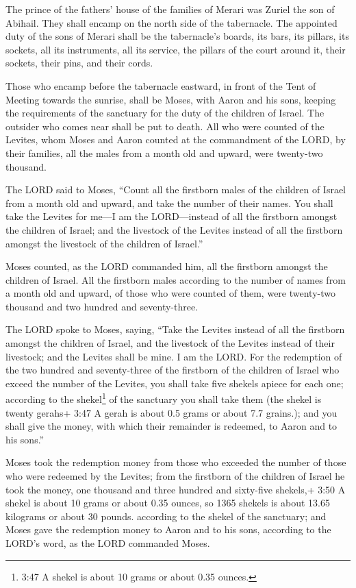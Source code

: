  The prince of the fathers' house of the families of Merari
was Zuriel the son of Abihail. They shall encamp on the north side of
the tabernacle.  The appointed duty of the sons of Merari
shall be the tabernacle's boards, its bars, its pillars, its sockets,
all its instruments, all its service,  the pillars of the
court around it, their sockets, their pins, and their cords.

 Those who encamp before the tabernacle eastward, in front
of the Tent of Meeting towards the sunrise, shall be Moses, with Aaron
and his sons, keeping the requirements of the sanctuary for the duty of
the children of Israel. The outsider who comes near shall be put to
death.  All who were counted of the Levites, whom Moses and
Aaron counted at the commandment of the LORD, by their families, all the
males from a month old and upward, were twenty-two thousand.

 The LORD said to Moses, ``Count all the firstborn males of
the children of Israel from a month old and upward, and take the number
of their names.  You shall take the Levites for me---I am
the LORD---instead of all the firstborn amongst the children of Israel;
and the livestock of the Levites instead of all the firstborn amongst
the livestock of the children of Israel.''

 Moses counted, as the LORD commanded him, all the
firstborn amongst the children of Israel.  All the
firstborn males according to the number of names from a month old and
upward, of those who were counted of them, were twenty-two thousand and
two hundred and seventy-three.

 The LORD spoke to Moses, saying,  ``Take the
Levites instead of all the firstborn amongst the children of Israel, and
the livestock of the Levites instead of their livestock; and the Levites
shall be mine. I am the LORD.  For the redemption of the
two hundred and seventy-three of the firstborn of the children of Israel
who exceed the number of the Levites,  you shall take five
shekels apiece for each one; according to the shekel\footnote{3:47 A
  shekel is about 10 grams or about 0.35 ounces.} of the sanctuary you
shall take them (the shekel is twenty gerahs+ 3:47 A gerah is about 0.5
grams or about 7.7 grains.);  and you shall give the money,
with which their remainder is redeemed, to Aaron and to his sons.''

 Moses took the redemption money from those who exceeded
the number of those who were redeemed by the Levites;  from
the firstborn of the children of Israel he took the money, one thousand
and three hundred and sixty-five shekels,+ 3:50 A shekel is about 10
grams or about 0.35 ounces, so 1365 shekels is about 13.65 kilograms or
about 30 pounds. according to the shekel of the sanctuary; 
and Moses gave the redemption money to Aaron and to his sons, according
to the LORD's word, as the LORD commanded Moses.

